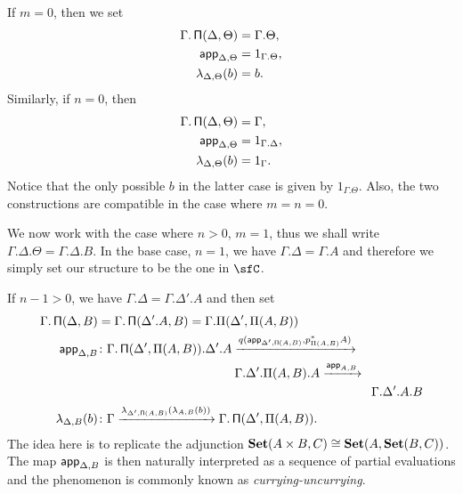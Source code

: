 \begin{construction}[Part 1]
  If $m=0$, then we set
  \begin{align*}
    \Gamma.\operatorname{\mathsf{\Pi}}(\Delta,\Theta) &=\Gamma.\Theta, \\
    \operatorname{\mathsf{app}}_{\Delta,\Theta} &=1_{\Gamma.\Theta}, \\
    \lambda_{\Delta,\Theta}(b) &=b.
  \end{align*}
  Similarly, if $n=0$, then
  \begin{align*}
    \Gamma.\operatorname{\mathsf{\Pi}}(\Delta,\Theta) &=\Gamma, \\
    \operatorname{\mathsf{app}}_{\Delta,\Theta} &=1_{\Gamma.\Delta}, \\
    \lambda_{\Delta,\Theta}(b) &=1_\Gamma.
  \end{align*}
  Notice that the only possible $b$ in the latter case is given by
  $1_{\Gamma.\Theta}$. Also, the two constructions are compatible in the case
  where $m=n=0$.

  We now work with the case where $n>0$, $m=1$, thus we shall write
  $\Gamma.\Delta.\Theta=\Gamma.\Delta.B$. In the base case, $n=1$, we have
  $\Gamma.\Delta=\Gamma.A$ and therefore we simply set our structure to be the
  one in $\sfC$.

  If $n-1>0$, we have
  $\Gamma.\Delta=\Gamma.\Delta'.A$ and then set
  \begin{align*}
    \Gamma.\operatorname{\mathsf{\Pi}}(\Delta,B)
    &=\Gamma.\operatorname{\mathsf{\Pi}}(\Delta'.A,B)=\Gamma.\Pi(\Delta',\Pi(A,B)) \\
    \operatorname{\mathsf{app}}_{\Delta,B} 
    &\colon
    \Gamma.\operatorname{\mathsf{\Pi}}(\Delta',\Pi(A,B)).\Delta'.A
                    \xrightarrow{q(\operatorname{\mathsf{app}}_{\Delta',\operatorname{\mathsf{\Pi}}(A,B)},p^*_{\Pi(A,B)}A)} \\
    &\quad\quad\quad\quad\quad\quad\quad\quad\quad\quad\quad
    \Gamma.\Delta'.\Pi(A,B).A
    \xrightarrow{\operatorname{\mathsf{app}}_{A,B}} \\
    &\quad\quad\quad\quad\quad\quad\quad\quad\quad\quad\quad\quad\quad\quad\quad\quad\quad\quad\quad\quad\quad\quad
    \Gamma.\Delta'.A.B \\
    \lambda_{\Delta,B}(b)
    &\colon
    \Gamma
    \xrightarrow{\lambda_{\Delta',\operatorname{\mathsf{\Pi}}(A,B)}(\lambda_{A,B}(b))}
    \Gamma.\operatorname{\mathsf{\Pi}}(\Delta',\Pi(A,B)).
  \end{align*}
  The idea here is to replicate the adjunction $\operatorname{\mathbf{Set}}(A\times
  B,C)\cong\operatorname{\mathbf{Set}}(A,\operatorname{\mathbf{Set}}(B,C))$. The map $\operatorname{\mathsf{app}}_{\Delta,B}$ is then naturally
  interpreted as a sequence of partial evaluations and the phenomenon is
  commonly known as \emph{currying-uncurrying}.

\end{construction}

